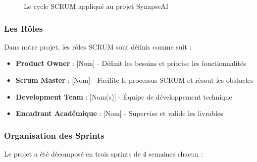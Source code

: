 \begin{figure}[H]
    \centering
    \caption{Le cycle SCRUM appliqué au projet SynapseAI}
    \label{fig:cycle-scrum}
\end{figure}

\subsubsection{Les Rôles}

Dans notre projet, les rôles SCRUM sont définis comme suit :

\begin{itemize}
    \item \textbf{Product Owner} : [Nom] - Définit les besoins et priorise les fonctionnalités
    \item \textbf{Scrum Master} : [Nom] - Facilite le processus SCRUM et résout les obstacles
    \item \textbf{Development Team} : [Nom(s)] - Équipe de développement technique
    \item \textbf{Encadrant Académique} : [Nom] - Supervise et valide les livrables
\end{itemize}

\subsubsection{Organisation des Sprints}

Le projet a été décomposé en trois sprints de 4 semaines chacun :

